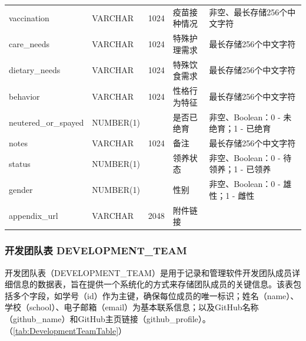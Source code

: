 \begin{longtable}[c]{@{}llrll@{}}
    vaccination           & VARCHAR       & 1024        & 疫苗接种情况      & 非空、最长存储256个中文字符                            \\
    care\_needs           & VARCHAR       & 1024        & 特殊护理需求      & 最长存储256个中文字符                               \\
    dietary\_needs        & VARCHAR       & 1024        & 特殊饮食需求      & 最长存储256个中文字符                               \\
    behavior              & VARCHAR       & 1024        & 性格行为特征      & 最长存储256个中文字符                               \\
    neutered\_or\_spayed  & NUMBER(1)     &             & 是否已绝育       & 非空、Boolean：0 - 未绝育；1 - 已绝育                 \\
    notes                 & VARCHAR       & 1024        & 备注          & 最长存储256个中文字符                               \\
    status                & NUMBER(1)     &             & 领养状态        & 非空、Boolean：0 - 待领养；1 - 已领养                 \\
    gender                & NUMBER(1)     &             & 性别          & 非空、Boolean：0 - 雄性；1 - 雌性                   \\
    appendix\_url         & VARCHAR       & 2048        & 附件链接        &                                            \\ \bottomrule
\end{longtable}

\subsubsection{开发团队表 DEVELOPMENT\_TEAM}

开发团队表（DEVELOPMENT\_TEAM）是用于记录和管理软件开发团队成员详细信息的数据表，旨在提供一个系统化的方式来存储团队成员的关键信息。该表包括多个字段，如学号（id）作为主键，确保每位成员的唯一标识；姓名（name）、学校（school）、电子邮箱（email）为基本联系信息；以及GitHub名称（github\_name）和GitHub主页链接（github\_profile）。（\cref{tab:DevelopmentTeamTable}）

